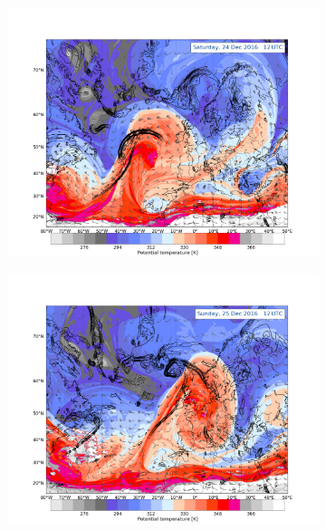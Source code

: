 \begin{figure}\ContinuedFloat
	\centering
    \begin{subfigure}[b]{0.49\textwidth}
        \includegraphics[trim={4.2cm 3.9cm 4.3cm 5.1cm},clip,
        width=\textwidth]{./fig_DynTropo/20161224_12}
        \caption{}\label{fig:DT24}
    \end{subfigure}
    \begin{subfigure}[b]{0.49\textwidth}
        \includegraphics[trim={4.2cm 3.9cm 4.3cm 5.1cm},clip,
        width=\textwidth]{./fig_DynTropo/20161225_12}
        \caption{}\label{fig:DT25}

\end{subfigure}
\end{figure}
